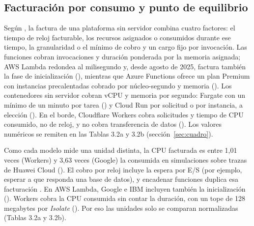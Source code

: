 \documentclass[12pt, letterpaper, table, xcdraw]{inf-pucv}
\begin{document}
\subsection{Facturación por consumo y punto de equilibrio}
\label{sec:facturacion}

Según \textcite{lin_demystifying_2026}, la factura de una plataforma sin servidor combina cuatro factores: el tiempo de reloj facturable, los recursos asignados o consumidos durante ese tiempo, la granularidad o el mínimo de cobro y un cargo fijo por invocación. Las funciones cobran invocaciones y duración ponderada por la memoria asignada; AWS Lambda redondea al milisegundo y, desde agosto de 2025, factura también la fase de inicialización (\cite{Shubham_aws_2025}), mientras que Azure Functions ofrece un plan Premium con instancias precalentadas cobrado por núcleo-segundo y memoria (\cite{microsoft2026functionsscale}). Los contenedores sin servidor cobran vCPU y memoria por segundo: Fargate con un mínimo de un minuto por tarea (\cite{aws_precios2026}) y Cloud Run por solicitud o por instancia, a elección (\cite{google2026cloudrunpricing}). En el borde, Cloudflare Workers cobra solicitudes y tiempo de CPU consumido, no de reloj, y no cobra transferencia de datos (\cite{aws_cloudflare_2026}). Los valores numéricos se remiten en las Tablas 3.2a y 3.2b (sección~\ref{sec:cuadro}).

Como cada modelo mide una unidad distinta, la CPU facturada es entre 1,01 veces (Workers) y 3,63 veces (Google) la consumida en simulaciones sobre trazas de Huawei Cloud (\cite{lin_demystifying_2026}). El cobro por reloj incluye la espera por E/S (por ejemplo, esperar a que responda una base de datos), y encadenar funciones duplica esa facturación \cite{eismann2021}. En AWS Lambda, Google e IBM incluyen también la inicialización  (\cite{lin_demystifying_2026}). Workers cobra la CPU consumida sin contar la duración, con un tope de 128 megabytes por {\itshape Isolate} (\cite{cloudflare2026workerslimits}). Por eso las unidades solo se comparan normalizadas (Tablas 3.2a y 3.2b).
\end{document}
